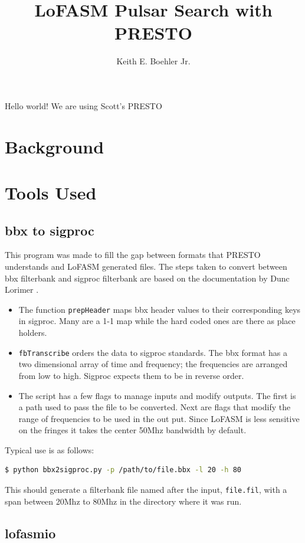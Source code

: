 \documentclass{article}
\title{LoFASM Pulsar Search with PRESTO}
\author{Keith E. Boehler Jr.}
\date{}
\begin{document}
\maketitle
   Hello world! We are using Scott's PRESTO \textcite{Ransom01}

\section{Background}

\section{Tools Used}
\subsection{bbx to sigproc}
This program was made to fill the gap between formats that PRESTO understands and LoFASM generated files. The steps taken to convert between bbx filterbank and sigproc filterbank are based on the documentation by Dunc Lorimer \textcite{LorimerSigproc}.
\begin{itemize}
	\item The function \texttt{prepHeader} maps bbx header values to their corresponding keys in sigproc. Many are a 1-1 map while the hard coded ones are there as place holders. 
	\item \texttt{fbTranscribe} orders the data to sigproc standards. The bbx format has a two dimensional array of time and frequency; the frequencies are arranged from low to high. Sigproc expects them to be in reverse order.   
	\item The script has a few flags to manage inputs and modify outputs. The first is a path used to pass the file to be converted. Next are flags that modify the range of frequencies to be used in the out put. Since LoFASM is less sensitive on the fringes it takes the center 50Mhz bandwidth by default.
\end{itemize}
Typical use is as follows: \begin{lstlisting}[language=bash]
$ python bbx2sigproc.py -p /path/to/file.bbx -l 20 -h 80
\end{lstlisting}
This should generate a filterbank file named after the input, \texttt{file.fil}, with a span between 20Mhz to 80Mhz in the directory where it was run.

\subsection{lofasmio}
\end{document}
